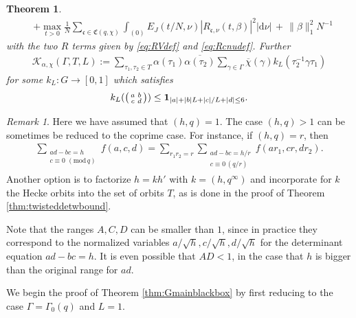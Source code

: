 \documentclass[12pt]{amsart}
\newtheorem{theorem}{Theorem}[section]
\theoremstyle{definition}
\theoremstyle{remark}
\newtheorem{remark}{Remark}
\numberwithin{equation}{section}
\newcommand{\1}{{\mathbf 1}}
\renewcommand{\c}{\mathfrak c}
\renewcommand{\d}{\mathrm d}
\renewcommand{\pmod}[1]{\,\,(\mathrm{mod}\,{#1})}
\begin{document}
\begin{theorem}
\begin{align*}
&+ \max_{t > 0} \frac{1}{N} \sum_{\c \in \mathfrak{C}(q,\chi)}\int_{(0)} E_J(t/N,\nu)  |R_{\c,\nu }(t,\beta)|^2 |\d \nu| \, + \,\|\beta \|_1^2  N^{-1}
\end{align*}
with the two $R$ terms given by \eqref{eq:RVdef} and \eqref{eq:Rcnudef}.
Further
\begin{align*}   \mathcal{K}_{\alpha,\chi}(\Gamma,T,L):=   \sum_{\tau_1, \tau_2 \in T} \alpha(\tau_1)  \overline{\alpha(\tau_2)}\sum_{\gamma \in \Gamma} \overline{\chi}(\gamma) k_L(\tau_2^{-1} \gamma\tau_1  )
\end{align*}
for some $k_L:G \to [0,1]$ which satisfies  
\begin{align*}
  k_L(\smqty(a& b \\ c & d)) \leq \mathbf{1}_{|a|+|b| L +|c|/L+|d| \leq 6}.
\end{align*}
\end{theorem}


\begin{remark}
    Here we have assumed that $(h,q)=1$. The case $(h,q)> 1$ can be sometimes be reduced to the coprime case. For instance, if $(h,q)= r$, then
\begin{align*}
    \sum_{\substack{ ad-bc = h \\c \equiv 0 \pmod{q}}} f(a,c,d)= \sum_{r_1 r_2 = r}   \sum_{\substack{ ad-bc = h/r \\c \equiv 0 \, (q/r)}} f(ar_1,c r,dr_2).
\end{align*}
Another option is to factorize $h=kh'$ with $k=(h,q^\infty)$ and incorporate for $k$ the Hecke orbits into the set of orbits $T$, as is done in the proof of Theorem \ref{thm:twisteddetwbound}. 
\end{remark}



Note that the ranges $A,C,D$ can be smaller than $1$, since in practice they correspond to the normalized variables $a/\sqrt{h}, c/\sqrt{h},d/\sqrt{h}$ for the determinant equation $ad-bc=h$. It is even possible that $AD < 1$, in the case that $h$ is bigger than the original range for $ad$. 

We begin the proof of Theorem \ref{thm:Gmainblackbox} by first reducing to the case $\Gamma=\Gamma_0(q)$ and $L=1$.
\end{document}

